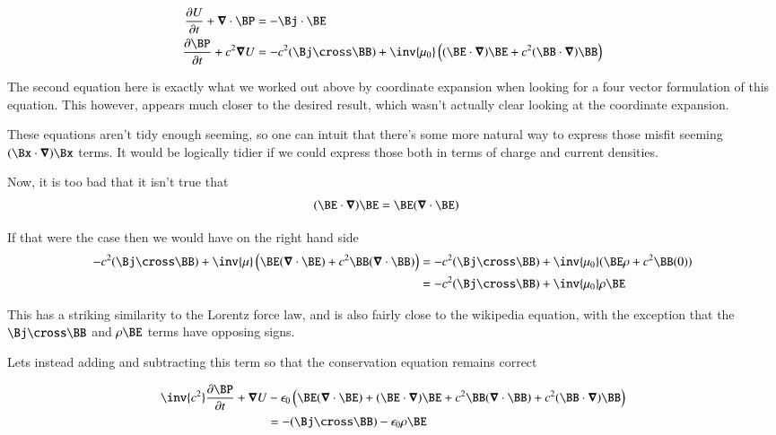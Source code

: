 \begin{align}\label{eqn:poynting_rate:withPoyntingAndEnergy}
\PD{t}{U} + \spacegrad \cdot \BP &= -\Bj \cdot \BE \\
\PD{t}{\BP} + c^2 \spacegrad U &= -c^2 (\Bj \cross \BB) + \inv{\mu_0} \left( (\BE \cdot \spacegrad) \BE + c^2 (\BB \cdot \spacegrad) \BB \right) 
\end{align}

The second equation here is exactly what we worked out above by coordinate expansion when looking for a four vector formulation
of this equation.  This however, appears much closer to the desired result, which wasn't actually clear looking at the
coordinate expansion.

These equations aren't tidy enough seeming, so one can intuit that there's some more natural way to express those
misfit seeming $(\Bx \cdot \spacegrad) \Bx$ terms.
It would be logically tidier if we could express those both in terms of charge and current densities.

Now, it is too bad that it isn't true that
\begin{align*}
(\BE \cdot \spacegrad) \BE &= \BE (\spacegrad \cdot \BE) 
\end{align*}

If that were the case then we would have on the right hand side
\begin{align*}
-c^2(\Bj \cross \BB)
+
\inv{\mu} \left(
\BE (\spacegrad \cdot \BE) + c^2 \BB (\spacegrad \cdot \BB) 
\right) 
&=
-c^2(\Bj \cross \BB) +
\inv{\mu_0} (\BE \rho + c^2 \BB (0)) \\
&= -c^2(\Bj \cross \BB) + \inv{\mu_0} \rho \BE \\
\end{align*}

This has a striking similarity to the Lorentz force law, and is also fairly close to the wikipedia equation, with the exception that the
$\Bj \cross \BB$ and $\rho \BE$ terms have opposing signs.

Lets instead adding and subtracting this term so that the conservation equation remains correct

\begin{align*}
\inv{c^2} \PD{t}{\BP} + \spacegrad U &-\epsilon_0 \left( 
\BE (\spacegrad \cdot \BE) +(\BE \cdot \spacegrad) \BE 
+ c^2 \BB (\spacegrad \cdot \BB) + c^2 (\BB \cdot \spacegrad) \BB 
\right) \\
&= -(\Bj \cross \BB) - \epsilon_0 \rho \BE 
\end{align*}

